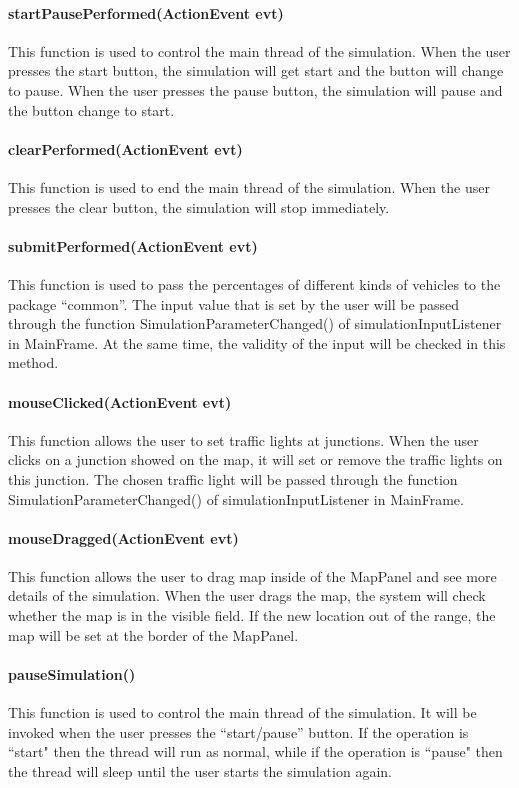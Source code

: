 \documentclass[a4paper,12pt]{article}
\begin{document}
\paragraph{startPausePerformed(ActionEvent evt)} This function is used to control the main thread of the simulation. When the user presses the start button, the simulation will get start and the button will change to pause. When the user presses the pause button, the simulation will pause and the button change to start.
\paragraph{clearPerformed(ActionEvent evt)} This function is used to end the main thread of the simulation. When the user presses the clear button, the simulation will stop immediately.
\paragraph{submitPerformed(ActionEvent evt)} This function is used to pass the percentages of different kinds of vehicles to the package ``common''. The input value that is set by the user will be passed through the function SimulationParameterChanged() of simulationInputListener in MainFrame. At the same time, the validity of the input will be checked in this method.

\paragraph{mouseClicked(ActionEvent evt)} This function allows the user to set traffic lights at junctions. When the user clicks on a junction showed on the map, it will set or remove the traffic lights on this junction. The chosen traffic light will be passed through the function SimulationParameterChanged() of simulationInputListener in MainFrame.
\paragraph{mouseDragged(ActionEvent evt)} This function allows the user to drag map inside of the MapPanel and see more details of the simulation. When the user drags the map, the system will check whether the map is in the visible field. If the new location out of the range, the map will be set at the border of the MapPanel.

\paragraph{pauseSimulation()} This function is used to control the main thread of the simulation. It will be invoked when the user presses the ``start/pause'' button. If the operation is  ``start" then the thread will run as normal, while if the operation is ``pause" then the thread will sleep until the user starts the simulation again.
\end{document}
